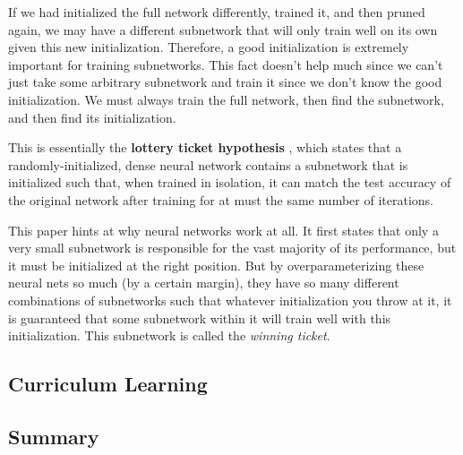 \documentclass{article}
\begin{document}
  If we had initialized the full network differently, trained it, and then pruned again, we may have a different subnetwork that will only train well on its own given this new initialization. Therefore, a good initialization is extremely important for training subnetworks. This fact doesn't help much since we can't just take some arbitrary subnetwork and train it since we don't know the good initialization. We must always train the full network, then find the subnetwork, and then find its initialization. 

  This is essentially the \textbf{lottery ticket hypothesis} \cite{lottery}, which states that a randomly-initialized, dense neural network contains a subnetwork that is initialized such that, when trained in isolation, it can match the test accuracy of the original network after training for at must the same number of iterations. 

  This paper hints at why neural networks work at all. It first states that only a very small subnetwork is responsible for the vast majority of its performance, but it must be initialized at the right position. But by overparameterizing these neural nets so much (by a certain margin), they have so many different combinations of subnetworks such that whatever initialization you throw at it, it is guaranteed that some subnetwork within it will train well with this initialization. This subnetwork is called the \textit{winning ticket}. 

\subsection{Curriculum Learning}

\subsection{Summary}
\end{document}
